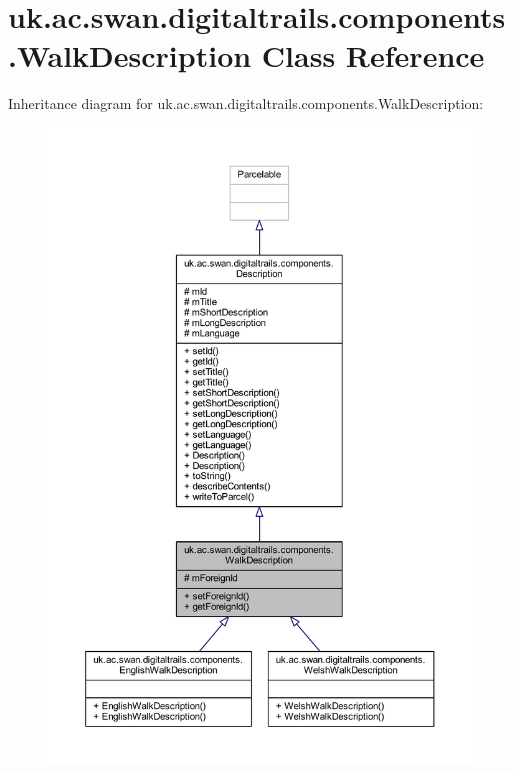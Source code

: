 \hypertarget{classuk_1_1ac_1_1swan_1_1digitaltrails_1_1components_1_1_walk_description}{\section{uk.\+ac.\+swan.\+digitaltrails.\+components.\+Walk\+Description Class Reference}
\label{classuk_1_1ac_1_1swan_1_1digitaltrails_1_1components_1_1_walk_description}
}


Inheritance diagram for uk.\+ac.\+swan.\+digitaltrails.\+components.\+Walk\+Description\+:
\nopagebreak
\begin{figure}[H]
\begin{center}
\leavevmode
\includegraphics[width=350pt]{classuk_1_1ac_1_1swan_1_1digitaltrails_1_1components_1_1_walk_description__inherit__graph}
\end{center}
\end{figure}


